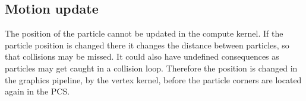 \subsection{Motion update} \label{mupt}

The position of the particle cannot be updated in the compute kernel. If the particle position is changed there it changes the distance between particles, so that collisions may be missed. It could also have undefined consequences as particles may get caught in a collision loop. Therefore the position is changed in the graphics pipeline, by the vertex kernel, before the particle corners are located again in the PCS.





